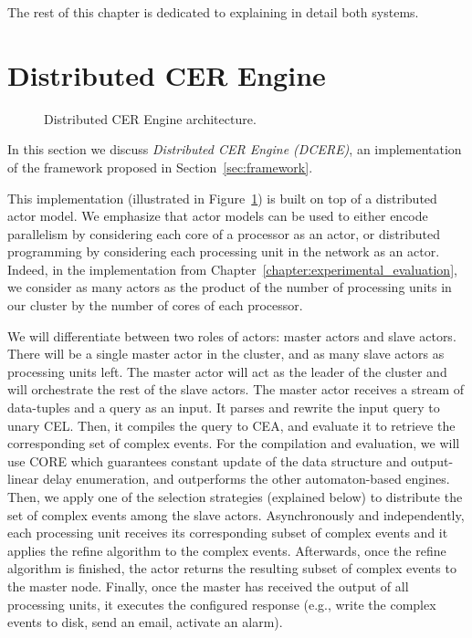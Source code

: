 The rest of this chapter is dedicated to explaining in detail both systems.

\section{Distributed CER Engine}\label{sec:dcere}

\begin{figure}[t]
  \centering
  \caption{Distributed CER Engine architecture.}
  \label{fig:dcere}
\end{figure}

In this section we discuss \emph{Distributed CER Engine (DCERE)}, an implementation of the framework proposed in Section~\ref{sec:framework}.

This implementation (illustrated in Figure~\ref{fig:dcere}) is built on top of a distributed actor model. We emphasize that actor models can be used to either encode parallelism by considering each core of a processor as an actor, or distributed programming by considering each processing unit in the network as an actor. Indeed, in the implementation from Chapter~\ref{chapter:experimental_evaluation}, we consider as many actors as the product of the number of processing units in our cluster by the number of cores of each processor.

We will differentiate between two roles of actors: master actors and slave actors. There will be a single master actor in the cluster, and as many slave actors as processing units left. The master actor will act as the leader of the cluster and will orchestrate the rest of the slave actors. The master actor receives a stream of data-tuples and a query as an input. It parses and rewrite the input query to unary CEL. Then, it compiles the query to CEA, and evaluate it to retrieve the corresponding set of complex events. For the compilation and evaluation, we will use CORE \cite{core} which guarantees constant update of the data structure and output-linear delay enumeration, and outperforms the other automaton-based engines. Then, we apply one of the selection strategies (explained below) to distribute the set of complex events among the slave actors. Asynchronously and independently, each processing unit receives its corresponding subset of complex events and it applies the refine algorithm to the complex events. Afterwards, once the refine algorithm is finished, the actor returns the resulting subset of complex events to the master node. Finally, once the master has received the output of all processing units, it executes the configured response (e.g., write the complex events to disk, send an email, activate an alarm).

